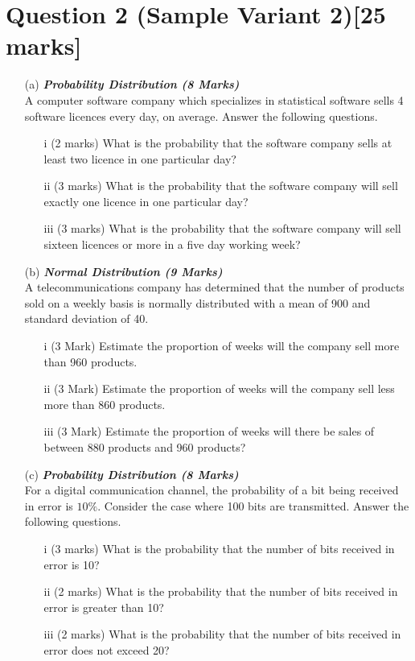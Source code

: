 \documentclass[]{article}
\begin{document}
\section*{Question 2 (Sample Variant 2)[25 marks]}
\begin{itemize}

\item[(a)] \textbf{\textit{Probability Distribution (8 Marks)}}\\ %
A computer software company which specializes in statistical software sells 4 software licences every day, on average. Answer the following questions.
    \begin{itemize}
    \item[i] (2 marks) What is the probability that the software company sells at least two licence in one particular day?
    \item[ii] (3 marks) What is the probability that the software company will sell exactly one licence in one particular day?
    \item[iii] (3 marks) What is the probability that the software company will sell sixteen licences or more in a five day working week?
    \end{itemize}


\item[(b)] \textbf{\textit{Normal Distribution (9 Marks)}}\\ %
 A telecommunications company has determined that the number of products sold on a weekly basis is normally distributed with a mean of 900 and standard deviation of 40.
\begin{itemize}
\item[i] (3 Mark) Estimate the proportion of weeks will the company sell more than 960 products.

\item[ii] (3 Mark) Estimate the proportion of weeks will the company sell less more than 860 products.
\item[iii] (3 Mark) Estimate the proportion of weeks will there be sales of between 880
products and 960 products?
\end{itemize}

\item[(c)] \textbf{\textit{Probability Distribution (8 Marks)}}\\ %

For a digital communication channel, the probability of a bit being received in error is $10\%$. Consider the case where 100 bits are transmitted. Answer the following questions.

\begin{itemize}
\item[i] (3 marks)	What is the probability that the number of bits received in error is 10?
\item[ii] (2 marks) What is the probability that the number of bits received in error is greater than 10?
\item[iii] (2 marks)	What is the probability that the number of bits received in error does not exceed 20?
\end{itemize}

\end{itemize}
\end{document}

